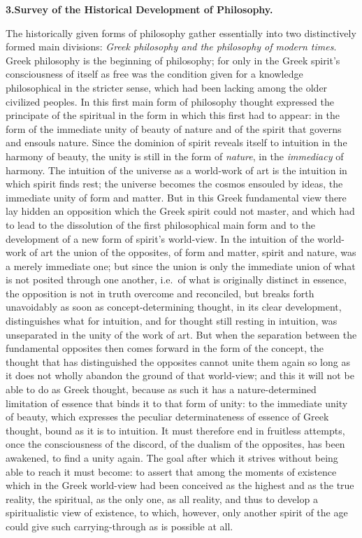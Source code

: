 \divrule

\begin{center}
\textbf{3.\enspace Survey of the Historical Development of Philosophy.}
\end{center}

The historically given forms of philosophy gather essentially into two
distinctively formed main divisions: \emph{Greek philosophy and the
philosophy of modern times}. Greek philosophy is the beginning of
philosophy; for only in the Greek spirit's consciousness of itself as
free was the condition given for a knowledge philosophical in the
stricter sense, which had been lacking among the older civilized
peoples. In this first main form of philosophy thought expressed the
principate of the spiritual in the form in which this first had
to appear: in the form of the immediate unity of beauty of nature and of
the spirit that governs and ensouls nature. Since the dominion of spirit
reveals itself to intuition in the harmony of beauty, the unity is still
in the form of \emph{nature}, in the \emph{immediacy} of harmony. The
intuition of the universe as a world-work of art is the intuition in
which spirit finds rest; the universe becomes the cosmos ensouled by
ideas, the immediate unity of form and matter. But in this Greek
fundamental view there lay hidden an opposition which the Greek spirit
could not master, and which had to lead to the dissolution of the first
philosophical main form and to the development of a new form of
spirit's world-view. In the intuition of the world-work of art the union
of the opposites, of form and matter, spirit and nature, was a merely
immediate one; but since the union is only the immediate union of what
is not posited through one another, i.e.\ of what is originally distinct
in essence, the opposition is not in truth overcome and reconciled, but
breaks forth unavoidably as soon as concept-determining thought, in its
clear development, distinguishes what for intuition, and for thought
still resting in intuition, was unseparated in the unity of the work of
art. But when the separation between the fundamental opposites then
comes forward in the form of the concept, the thought that has
distinguished the opposites cannot unite them again so long as it does
not wholly abandon the ground of that world-view; and this it will not
be able to do as Greek thought, because as such it has a
nature-determined limitation of essence that binds it to that form of
unity: to the immediate unity of beauty, which expresses the peculiar
determinateness of essence of Greek thought, bound as it is to
intuition. It must therefore end in fruitless attempts, once the
consciousness of the discord, of the dualism of the opposites, has been
awakened, to find a unity again. The goal after which it strives without
being able to reach it must become: to assert that among the moments of
existence which in the Greek world-view had been conceived as the
highest and as the true reality, the spiritual, as the only
one, as all reality, and thus to develop a spiritualistic view of
existence, to which, however, only another spirit of the age could give
such carrying-through as is possible at all.

